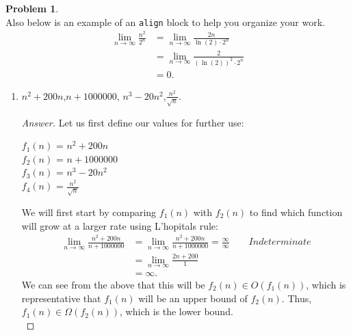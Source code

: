 \documentclass[11pt]{article}
\theoremstyle{definition}
\theoremstyle{definition}
\newtheorem{required}{Problem}
\theoremstyle{definition}
\begin{document}
\begin{required}
\noindent \\ Also below is an example of an \texttt{align} block to help you organize your work.
\begin{align*}
\lim_{n \to \infty} \frac{n^{2}}{2^{n}} &= \lim_{n \to \infty} \frac{2n}{\ln(2) \cdot 2^{n}} \\
&= \lim_{n \to \infty} \frac{2}{(\ln(2))^{2} \cdot 2^{n}} \\
&= 0.
\end{align*}
\newpage
\begin{enumerate} [label=(\alph*)]
\subsection{Problem 12\ref{1a}}
    \item \label{1a} $ n^2+200n$,\qquad  $n+1000000$, \qquad $n^3-20n^2$,\qquad  $\frac{n^2}{\sqrt{n}}$.
    \begin{proof}[Answer]
Let us first define our values for further use:
\begin{center}
$f_1(n)$ = $ n^2+200n$ \\
$f_2(n)$ =  $n+1000000$ \\
$f_3(n)$ = $n^3-20n^2$ \\
$f_4(n)$ = $\frac{n^2}{\sqrt{n}}$ \\
\end{center}
We will first start by comparing $f_1(n)$ with $f_2(n)$ to find which function will grow at a larger rate using L'hopitals rule: \\
\begin{align*}
\lim_{n \to \infty} \frac{n^2+200n}{n+1000000} &= \lim_{n \to \infty} \frac{n^2+200n}{n+1000000} = \frac{\infty}{\infty} \qquad Indeterminate \\
&= \lim_{n \to \infty} \frac{2n+200}{1} \\
&= \infty.
\end{align*}
We can see from the above that this will be  $f_2(n) \in O(f_1(n))$, which is representative that $f_1(n)$ will be an upper bound of $f_2(n)$. Thus, $f_1(n) \in \Omega(f_2(n))$, which is the lower bound. \\


\end{proof}
\end{enumerate}
\end{required}
\end{document}
